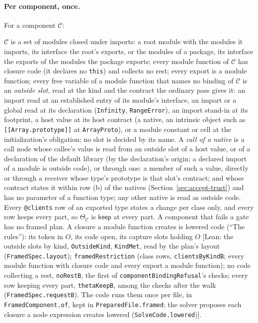 \documentclass[10pt,a4paper]{article}
\theoremstyle{definition}
\theoremstyle{remark}
\newcommand{\kw}[1]{\mathsf{#1}}
\newcommand{\keep}{\kw{keep}}
\newcommand{\code}[1]{\texttt{#1}}
\newcommand{\lean}[1]{\texttt{\small #1}}
\newcommand{\status}[1]{\textsf{\small[#1]}}
\newcommand{\cC}{\mathcal{C}}
\begin{document}
\paragraph{Per component, once.} For a component $\cC$:
\begin{description}[leftmargin=1.5em,style=nextline]
\item[(A1) Gates] $\cC$ is a set of modules closed under imports: a
root module with the modules it imports, its interface the root's
exports, or the modules of a package, its interface the exports of the
modules the package exports;
every module function of $\cC$ has closure code (it declares no
\code{this}) and collects no rest; every export is a module function;
every free variable of a module function that names no binding of
$\cC$ is an \emph{outside slot}, read at the kind and the contract the
ordinary pass gives it: an import read at an established entry of its
module's interface, an import or a global read at its declaration
(\code{Infinity}, \code{RangeError}), an import stand-in at its footprint,
a host value at its host contract (a native, an intrinsic object such as
\code{[[Array.prototype]]} at \code{ArrayProto}), or a module constant or
cell at the initialization's obligation; no slot is decided by its name.
A \emph{call of a native} is a call node whose callee's value is read
from an outside slot of a host value, or of a declaration of the default
library (by the declaration's origin; a declared import of a module is
outside code), or through one: a member of such a value, directly or
through a receiver whose type's prototype is that slot's contract; and
whose contract states it within row (b) of the natives
(Section~\ref{sec:accept-trust}) and has no parameter of a function
type; any other native is read as outside code.
Every \code{@clients} row of
an exported type states a change per class only, and every row keeps
every part, so $\Theta_\cC$ is $\keep$ at every part. A component that
fails a gate has no framed plan. A closure a module function creates is
lowered code (``The rules''): its token in $O$, its code open, its
capture slots holding $O$
\status{Lean: the outside slots by kind, \lean{OutsideKind}, \lean{KindMet}, read by the plan's layout (\lean{FramedSpec.layout}); \lean{framedRestriction} (class rows, \lean{clientsByKindB}; every module function with closure code and every export a module function); no code collecting a rest, \lean{noRestB}, the first of \lean{componentBindingRefusal}'s checks; every row keeping every part, \lean{thetaKeepB}, among the checks after the walk (\lean{FramedSpec.requestB}). The code runs them once per file, in \lean{FramedComponent.of}, kept in \lean{PreparedFile.framed}; the solver proposes each closure a node expression creates lowered (\lean{SolveCode.lowered})}.

\end{description}
\end{document}
